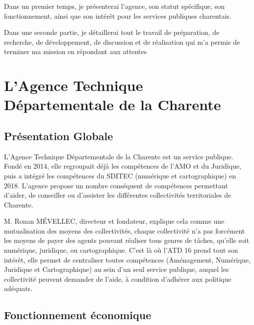 \documentclass[a4paper,12pt]{report}
\begin{document}
\vspace{1em}

Dans un premier temps, je présenterai l'agence, son statut spécifique, son fonctionnement, ainsi que son intérêt pour les services publiques charentais.


Dans une seconde partie, je détaillerai tout le travail de préparation, de recherche, de développement, de discussion et de réalisation qui m'a permis de terminer ma mission en répondant aux attentes

\chapter{L'Agence Technique Départementale de la Charente}
\section{Présentation Globale}

L'Agence Technique Départementale de la Charente est un service publique. Fondé en 2014, elle regroupait déjà les compétences de l'AMO et du Juridique, puis  a intégré les compétences du SDITEC (numérique et cartographique) en 2018. L'agence propose un nombre conséquent de compétences permettant d'aider, de conseiller ou d'assister les différentes collectivités territoriales de Charente.


M. Ronan MÉVELLEC, directeur et fondateur, explique cela comme une mutualisation des moyens des collectivités, chaque collectivité n'a pas forcément les moyens de payer des agents pouvant réaliser tous genres de tâches, qu'elle soit numérique, juridique, ou cartographique. C'est là où l'ATD 16 prend tout son intérêt, elle permet de centraliser toutes compétences (Aménagement, Numérique, Juridique et Cartographique) au sein d'un seul service publique, auquel les collectivité peuvent demander de l'aide, à condition d'adhérer aux politique adéquats.

\section{Fonctionnement économique}
\end{document}
